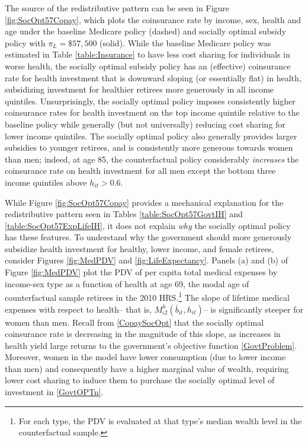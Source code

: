 \documentclass[12pt,pdftex,letterpaper]{article}
\newcommand{\Type}{\iota}
\newcommand{\Health}{h}
\newcommand{\Bank}{b}
\begin{document}
The source of the redistributive pattern can be seen in Figure \ref{fig:SocOpt57Copay}, which plots the coinsurance rate by income, sex, health and age under the baseline Medicare policy (dashed) and socially optimal subsidy policy with $\pi_L = \$57,500$ (solid).  While the baseline Medicare policy was estimated in Table \ref{table:Insurance} to have less cost sharing for individuals in worse health, the socially optimal subsidy policy has an (effective) coinsurance rate for health investment that is downward sloping (or essentially flat) in health, subsidizing investment for healthier retirees more generously in all income quintiles.  Unsurprisingly, the socially optimal policy imposes consistently higher coinsurance rates for health investment on the top income quintile relative to the baseline policy while generally (but not universally) reducing cost sharing for lower income quintiles.  The socially optimal policy also generally provides larger subsidies to younger retirees, and is consistently more generous towards women than men; indeed, at age 85, the counterfactual policy considerably \textit{increases} the coinsurance rate on health investment for all men except the bottom three income quintiles above $\Health_{it} > 0.6$.

While Figure \ref{fig:SocOpt57Copay} provides a mechanical explanation for the redistributive pattern seen in Tables \ref{table:SocOpt57GovtIH} and \ref{table:SocOpt57ExpLifeIH}, it does not explain \textit{why} the socially optimal policy has these features.  To understand why the government should more generously subsidize health investment for healthy, lower income, and female retirees, consider Figures \ref{fig:MedPDV} and \ref{fig:LifeExpectancy}.  Panels (a) and (b) of Figure \ref{fig:MedPDV} plot the PDV of per capita total medical expenses by income-sex type as a function of health at age 69, the modal age of counterfactual sample retirees in the 2010 HRS.\footnote{For each type, the PDV is evaluated at that type's median wealth level in the counterfactual sample.}  The slope of lifetime medical expenses with respect to health-- that is, $M_{\Type 2}^\Health(\bar{\Bank}_{it},\Health_{it})$-- is significantly steeper for women than men.  Recall from \eqref{CopaySocOpt} that the socially optimal coinsurance rate is decreasing in the magnitude of this slope, as increases in health yield large returns to the government's objective function \eqref{GovtProblem}.  Moreover, women in the model have lower consumption (due to lower income than men) and consequently have a higher marginal value of wealth, requiring lower cost sharing to induce them to purchase the socially optimal level of investment in \eqref{GovtOPTn}.
\end{document}
